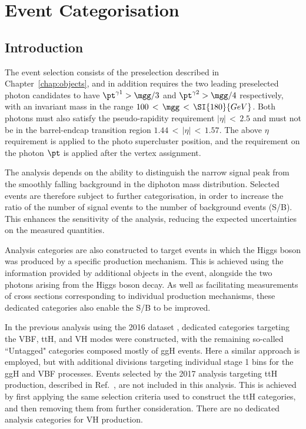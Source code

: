 \chapter{Event Categorisation}
\label{chap:categorisation}

\section{Introduction}

The event selection consists of the preselection described in Chapter~\ref{chap:objects}, 
and in addition requires the two leading preselected photon candidates to have 
$\pt^{\gamma 1} > \mgg/3$ and $\pt^{\gamma 2} > \mgg /4$ respectively, 
with an invariant mass in the range $100\,<\,\mgg\,<\,\SI{180}{GeV}$.
Both photons must also satisfy the
pseudo-rapidity requirement $|\eta|\,<\,2.5$ and must not be in the barrel-endcap
transition region $1.44\,<\,|\eta|\,<\,1.57$.
The above $\eta$ requirement is applied to the photo supercluster
position, and the requirement on the photon $\pt$ is applied 
after the vertex assignment.

The \Hgg analysis depends on the ability to distinguish the narrow signal peak 
from the smoothly falling background in the diphoton mass distribution.
Selected events are therefore subject to further categorisation, in order to 
increase the ratio of the number of signal events to the number of background events (S/B).
This enhances the sensitivity of the analysis, 
reducing the expected uncertainties on the measured quantities.

Analysis categories are also constructed to target events in which the Higgs boson was 
produced by a specific production mechanism. 
This is achieved using the information provided by additional objects in the event, 
alongside the two photons arising from the Higgs boson decay.
As well as facilitating measurements of cross sections corresponding 
to individual production mechanisms, these dedicated categories also enable the S/B to be improved.

In the previous \Hgg analysis using the 2016 dataset \cite{HIG-16-040}, 
dedicated categories targeting the VBF, ttH, and VH modes were constructed, 
with the remaining so-called ``Untagged" categories composed mostly of ggH events.
Here a similar approach is employed, 
but with additional divisions targeting individual stage 1 bins for the ggH and VBF processes.
Events selected by the 2017 \Hgg analysis targeting ttH production, 
described in Ref.~\cite{HIG-18-018}, are not included in this analysis. 
This is achieved by first applying the same selection criteria used to construct the ttH categories, 
and then removing them from further consideration. 
There are no dedicated analysis categories for VH production.

